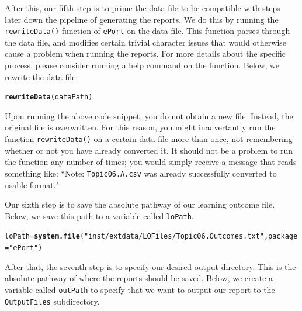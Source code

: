 \documentclass{article}\usepackage[]{graphicx}\usepackage[]{color}
\makeatletter
\newcommand{\hlstr}[1]{\textcolor[rgb]{0.192,0.494,0.8}{#1}}%
\newcommand{\hlstd}[1]{\textcolor[rgb]{0.345,0.345,0.345}{#1}}%
\newcommand{\hlkwb}[1]{\textcolor[rgb]{0.69,0.353,0.396}{#1}}%
\newcommand{\hlkwc}[1]{\textcolor[rgb]{0.333,0.667,0.333}{#1}}%
\newcommand{\hlkwd}[1]{\textcolor[rgb]{0.737,0.353,0.396}{\textbf{#1}}}%
\newenvironment{kframe}{%
 \def\at@end@of@kframe{}%
 \ifinner\ifhmode%
  \def\at@end@of@kframe{\end{minipage}}%
  \begin{minipage}{\columnwidth}%
 \fi\fi%
 \def\FrameCommand##1{\hskip\@totalleftmargin \hskip-\fboxsep
 \colorbox{shadecolor}{##1}\hskip-\fboxsep
     \hskip-\linewidth \hskip-\@totalleftmargin \hskip\columnwidth}%
 \MakeFramed {\advance\hsize-\width
   \@totalleftmargin\z@ \linewidth\hsize
   \@setminipage}}%
 {\par\unskip\endMakeFramed%
 \at@end@of@kframe}
\newenvironment{knitrout}{}{} %
\numberwithin{equation}{section} %
\makeatother
\begin{document}
After this, our fifth step is to prime the data file to be compatible with steps later down the pipeline of generating the reports. We do this by running the \texttt{rewriteData()} function of \texttt{ePort} on the data file. This function parses through the data file, and modifies certain trivial character issues that would otherwise cause a problem when running the reports. For more details about the specific process, please consider running a help command on the function. Below, we rewrite the data file: \\

\begin{knitrout}
\color{fgcolor}\begin{kframe}
\begin{alltt}
\hlkwd{rewriteData}\hlstd{(dataPath)}
\end{alltt}
\end{kframe}
\end{knitrout}

Upon running the above code snippet, you do not obtain a new file. Instead, the original file is overwritten. For this reason, you might inadvertantly run the function \texttt{rewriteData()} on a certain data file more than once, not remembering whether or not you have already converted it. It should not be a problem to run the function any number of times; you would simply receive a message that reads something like: ``Note: \texttt{Topic06.A.csv} was already successfully converted to usable format."

Our sixth step is to save the absolute pathway of our learning outcome file. Below, we save this path to a variable called \texttt{loPath}. \\

\begin{knitrout}
\color{fgcolor}\begin{kframe}
\begin{alltt}
\hlstd{loPath} \hlkwb{=} \hlkwd{system.file}\hlstd{(}\hlstr{"inst/extdata/LOFiles/Topic06.Outcomes.txt"}\hlstd{,} \hlkwc{package} \hlstd{=} \hlstr{"ePort"}\hlstd{)}
\end{alltt}
\end{kframe}
\end{knitrout}

After that, the seventh step is to specify our desired output directory. This is the absolute pathway of where the reports should be saved. Below, we create a variable called \texttt{outPath} to specify that we want to output our report to the \texttt{OutputFiles} subdirectory. \\
\end{document}
